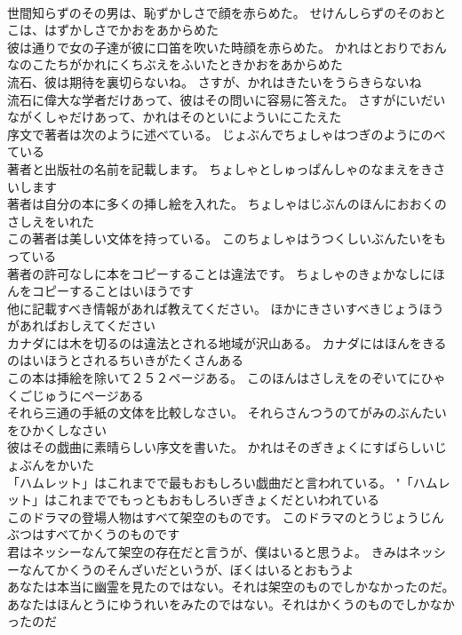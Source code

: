 \documentclass[8pt]{extreport}
\begin{document}
\begin{CJK}{UTF8}{min}
\\	世間知らずのその男は、恥ずかしさで顔を赤らめた。	せけんしらずのそのおとこは、はずかしさでかおをあからめた 
\\	彼は通りで女の子達が彼に口笛を吹いた時顔を赤らめた。	かれはとおりでおんなのこたちがかれにくちぶえをふいたときかおをあからめた 
\\	流石、彼は期待を裏切らないね。	さすが、かれはきたいをうらきらないね 
\\	流石に偉大な学者だけあって、彼はその問いに容易に答えた。	さすがにいだいながくしゃだけあって、かれはそのといによういにこたえた 
\\	序文で著者は次のように述べている。	じょぶんでちょしゃはつぎのようにのべている 
\\	著者と出版社の名前を記載します。	ちょしゃとしゅっぱんしゃのなまえをきさいします 
\\	著者は自分の本に多くの挿し絵を入れた。	ちょしゃはじぶんのほんにおおくのさしえをいれた 
\\	この著者は美しい文体を持っている。	このちょしゃはうつくしいぶんたいをもっている 
\\	著者の許可なしに本をコピーすることは違法です。	ちょしゃのきょかなしにほんをコピーすることはいほうです 
\\	他に記載すべき情報があれば教えてください。	ほかにきさいすべきじょうほうがあればおしえてください 
\\	カナダには木を切るのは違法とされる地域が沢山ある。	カナダにはほんをきるのはいほうとされるちいきがたくさんある 
\\	この本は挿絵を除いて２５２ページある。	このほんはさしえをのぞいてにひゃくごじゅうにページある 
\\	それら三通の手紙の文体を比較しなさい。	それらさんつうのてがみのぶんたいをひかくしなさい 
\\	彼はその戯曲に素晴らしい序文を書いた。	かれはそのぎきょくにすばらしいじょぶんをかいた 
\\	「ハムレット」はこれまでで最もおもしろい戯曲だと言われている。	"「ハムレット」はこれまででもっともおもしろいぎきょくだといわれている 
\\	このドラマの登場人物はすべて架空のものです。	このドラマのとうじょうじんぶつはすべてかくうのものです 
\\	君はネッシーなんて架空の存在だと言うが、僕はいると思うよ。	きみはネッシーなんてかくうのそんざいだというが、ぼくはいるとおもうよ 
\\	あなたは本当に幽霊を見たのではない。それは架空のものでしかなかったのだ。	あなたはほんとうにゆうれいをみたのではない。それはかくうのものでしかなかったのだ 

\end{CJK}
\end{document}
